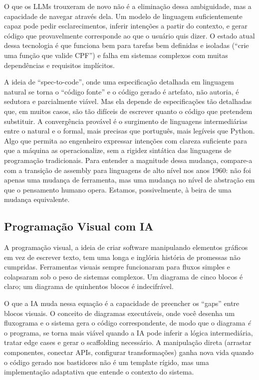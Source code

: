O que os LLMs trouxeram de novo não é a eliminação dessa ambiguidade, mas a capacidade de navegar através dela. Um modelo de linguagem suficientemente capaz pode pedir esclarecimentos, inferir intenções a partir do contexto, e gerar código que provavelmente corresponde ao que o usuário quis dizer. O estado atual dessa tecnologia é que funciona bem para tarefas bem definidas e isoladas (``crie uma função que valide CPF'') e falha em sistemas complexos com muitas dependências e requisitos implícitos.

A ideia de ``spec-to-code'', onde uma especificação detalhada em linguagem natural se torna o ``código fonte'' e o código gerado é artefato, não autoria, é sedutora e parcialmente viável. Mas ela depende de especificações tão detalhadas que, em muitos casos, são tão difíceis de escrever quanto o código que pretendem substituir. A convergência provável é o surgimento de linguagens intermediárias entre o natural e o formal, mais precisas que português, mais legíveis que Python. Algo que permita ao engenheiro expressar intenções com clareza suficiente para que a máquina as operacionalize, sem a rigidez sintática das linguagens de programação tradicionais. Para entender a magnitude dessa mudança, compare-a com a transição de assembly para linguagens de alto nível nos anos 1960: não foi apenas uma mudança de ferramenta, mas uma mudança no nível de abstração em que o pensamento humano opera. Estamos, possivelmente, à beira de uma mudança equivalente.

\subsection{Programação Visual com IA}

A programação visual, a ideia de criar software manipulando elementos gráficos em vez de escrever texto, tem uma longa e inglória história de promessas não cumpridas. Ferramentas visuais sempre funcionaram para fluxos simples e colapsaram sob o peso de sistemas complexos. Um diagrama de cinco blocos é claro; um diagrama de quinhentos blocos é indecifrável.

O que a IA muda nessa equação é a capacidade de preencher os ``gaps'' entre blocos visuais. O conceito de diagramas executáveis, onde você desenha um fluxograma e o sistema gera o código correspondente, de modo que o diagrama \textit{é} o programa, se torna mais viável quando a IA pode inferir a lógica intermediária, tratar edge cases e gerar o scaffolding necessário. A manipulação direta (arrastar componentes, conectar APIs, configurar transformações) ganha nova vida quando o código gerado nos bastidores não é um template rígido, mas uma implementação adaptativa que entende o contexto do sistema.

